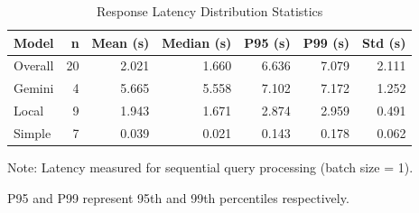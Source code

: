 \begin{table}[htbp]
\centering
\caption{Response Latency Distribution Statistics}
\label{tab:latency_distribution}
\begin{tabular}{lrrrrrr}
\toprule
Model & n & Mean (s) & Median (s) & P95 (s) & P99 (s) & Std (s) \\
\midrule
Overall & 20 & 2.021 & 1.660 & 6.636 & 7.079 & 2.111 \\
\midrule
Gemini & 4 & 5.665 & 5.558 & 7.102 & 7.172 & 1.252 \\
Local & 9 & 1.943 & 1.671 & 2.874 & 2.959 & 0.491 \\
Simple & 7 & 0.039 & 0.021 & 0.143 & 0.178 & 0.062 \\
\bottomrule
\end{tabular}
\begin{tablenotes}
\small
\item Note: Latency measured for sequential query processing (batch size = 1).
\item P95 and P99 represent 95th and 99th percentiles respectively.
\end{tablenotes}
\end{table}
